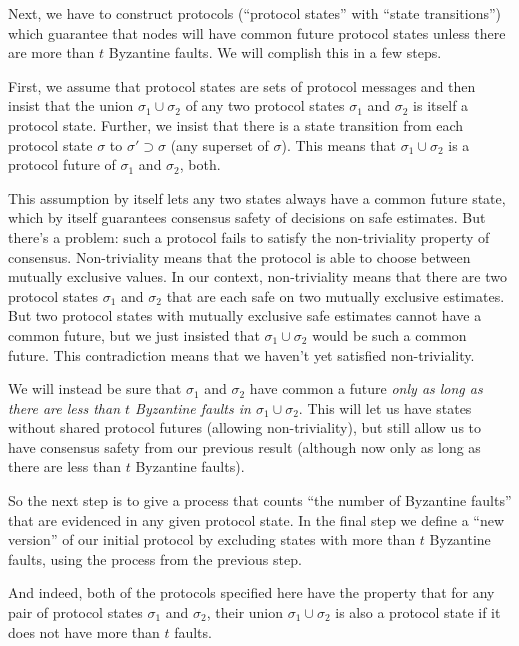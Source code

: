 \documentclass{article}
\theoremstyle{definition}
\begin{document}
Next, we have to construct protocols (``protocol states'' with ``state transitions'') which guarantee that nodes will have common future protocol states unless there are more than $t$ Byzantine faults. We will complish this in a few steps.

First, we assume that protocol states are sets of protocol messages and then insist that the union $\sigma_1 \cup \sigma_2$ of any two protocol states $\sigma_1$ and $\sigma_2$ is itself a protocol state. Further, we insist that there is a state transition from each protocol state $\sigma$ to $\sigma' \supset \sigma$ (any superset of $\sigma$). This means that $\sigma_1 \cup \sigma_2$ is a protocol future of $\sigma_1$ and $\sigma_2$, both.

This assumption by itself lets any two states always have a common future state, which by itself guarantees consensus safety of decisions on safe estimates. But there's a problem: such a protocol fails to satisfy the non-triviality property of consensus. Non-triviality means that the protocol is able to choose between mutually exclusive values. In our context, non-triviality means that there are two protocol states $\sigma_1$ and $\sigma_2$ that are each safe on two mutually exclusive estimates. But two protocol states with mutually exclusive safe estimates cannot have a common future, but we just insisted that $\sigma_1 \cup \sigma_2$ would be such a common future. This contradiction means that we haven't yet satisfied non-triviality.

We will instead be sure that $\sigma_1$ and $\sigma_2$ have common a future \emph{only as long as there are less than $t$ Byzantine faults in $\sigma_1 \cup \sigma_2$}. This will let us have states without shared protocol futures (allowing non-triviality), but still allow us to have consensus safety from our previous result (although now only as long as there are less than $t$ Byzantine faults).

So the next step is to give a process that counts ``the number of Byzantine faults'' that are evidenced in any given protocol state. In the final step we define a ``new version'' of our initial protocol by excluding states with more than $t$ Byzantine faults, using the process from the previous step.

And indeed, both of the protocols specified here have the property that for any pair of protocol states $\sigma_1$ and $\sigma_2$, their union $\sigma_1 \cup \sigma_2$ is also a protocol state if it does not have more than $t$ faults.
\end{document}
